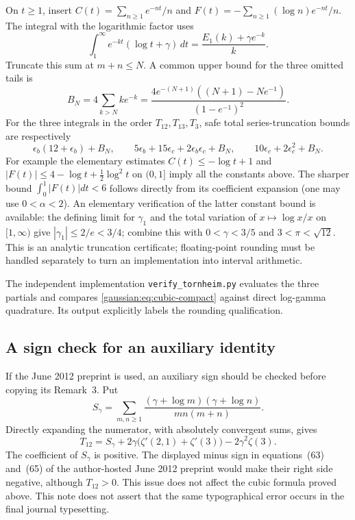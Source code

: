 On $t\ge1$, insert
$C(t)=\sum_{n\ge1}e^{-nt}/n$ and
$F(t)=-\sum_{n\ge1}(\log n)e^{-nt}/n$.  The integral with the logarithmic
factor uses
\[
 \int_1^\infty e^{-kt}(\log t+\gamma)\,dt
 =\frac{E_1(k)+\gamma e^{-k}}k.
\]
Truncate this sum at $m+n\le N$.  A common upper bound for the three
omitted tails is
\[
 B_N=4\sum_{k>N}ke^{-k}
 =\frac{4e^{-(N+1)}((N+1)-Ne^{-1})}{(1-e^{-1})^2}.
\]
For the three integrals in the order $T_{12},T_{13},T_3$, safe total
series-truncation bounds are respectively
\[
 \epsilon_b(12+\epsilon_b)+B_N,\qquad
 5\epsilon_b+15\epsilon_c+2\epsilon_b\epsilon_c+B_N,\qquad
 10\epsilon_c+2\epsilon_c^2+B_N.
\]
For example the elementary estimates
$C(t)\le-\log t+1$ and
$|F(t)|\le4-\log t+\tfrac12\log^2t$ on $(0,1]$ imply all the constants
above.  The sharper bound $\int_0^1|F(t)|dt<6$ follows directly from its
coefficient expansion (one may use $0<\alpha<2$).
An elementary verification of the latter constant bound is available:
the defining limit for $\gamma_1$ and the total variation of
$x\mapsto\log x/x$ on $[1,\infty)$ give $|\gamma_1|\le2/e<3/4$;
combine this with $0<\gamma<3/5$ and $3<\pi<\sqrt{12}$.
This is an analytic truncation certificate; floating-point rounding must
be handled separately to turn an implementation into interval arithmetic.

The independent implementation \texttt{verify\_tornheim.py} evaluates the
three partials and compares \eqref{gaussian:eq:cubic-compact} against direct log-gamma
quadrature.  Its output explicitly labels the rounding qualification.

\subsection{A sign check for an auxiliary identity}

If the June 2012 preprint is used, an auxiliary sign should be checked
before copying its Remark~3.  Put
\[
 S_\gamma=\sum_{m,n\ge1}
        \frac{(\gamma+\log m)(\gamma+\log n)}{mn(m+n)}.
\]
Directly expanding the numerator, with absolutely convergent sums, gives
\[
 T_{12}=S_\gamma+2\gamma\bigl(\zeta'(2,1)+\zeta'(3)\bigr)
                  -2\gamma^2\zeta(3).
\]
The coefficient of $S_\gamma$ is positive.  The displayed minus sign in
equations~(63) and~(65) of the author-hosted June 2012 preprint would make
their right side negative, although $T_{12}>0$.  This issue does not
affect the cubic formula proved above.  This note does not assert that
the same typographical error occurs in the final journal typesetting.

